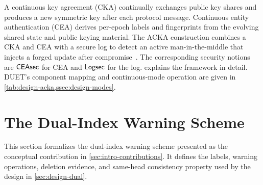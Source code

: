 \begin{definition}\label{def:cka}
A continuous key agreement (CKA) continually exchanges public key shares and produces a new
symmetric key after each protocol message. Continuous entity authentication (CEA) derives
per-epoch labels and fingerprints from the evolving shared state and public keying material. The
ACKA construction combines a CKA and CEA with a secure log to detect an active
man-in-the-middle that injects a forged update after
compromise~\cite[Sections~4.1--4.2]{dowling2023acka}. The corresponding security notions are
$\mathsf{CEAsec}$ for CEA and $\mathsf{Logsec}$ for the log.  explains the framework in detail.
DUET's component mapping and continuous-mode operation are given in
\cref{tab:design-acka,ssec:design-modes}.
\end{definition}

\section{The Dual-Index Warning Scheme}\label{sec:def-dualindex}

This section formalizes the dual-index warning scheme presented as the conceptual contribution in
\cref{sec:intro-contributions}. It defines the labels, warning operations, deletion evidence, and
same-head consistency property used by the design in \cref{sec:design-dual}.

